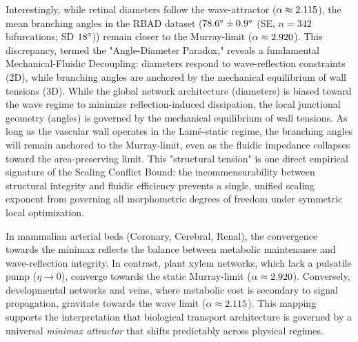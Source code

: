 Interestingly, while retinal diameters follow the wave-attractor ($\alpha
\approx 2.115$), the mean branching angles in the RBAD dataset
($78.6^\circ \pm 0.9^\circ$ (SE, $n{=}342$
bifurcations; SD $18^\circ$)) remain closer to the Murray-limit
($\alpha \approx 2.920$). This discrepancy, termed the "Angle-Diameter
Paradox," reveals a fundamental Mechanical-Fluidic Decoupling: diameters respond
to wave-reflection constraints (2D), while branching angles are anchored by the
mechanical equilibrium of wall tensions (3D). While the global network
architecture (diameters) is biased toward the wave regime to minimize
reflection-induced dissipation, the local junctional geometry (angles) is
governed by the mechanical equilibrium of wall tensions. As long as the vascular
wall operates in the Lam\'{e}-static regime, the branching angles will remain
anchored to the Murray-limit, even as the fluidic impedance collapses toward the
area-preserving limit. This "structural tension" is one direct empirical
signature of the Scaling Conflict Bound: the incommensurability between
structural integrity and fluidic efficiency prevents a single, unified scaling
exponent from governing all morphometric degrees of freedom under symmetric
local optimization.

In mammalian arterial beds (Coronary, Cerebral, Renal), the convergence towards
the minimax reflects the balance between metabolic maintenance and
wave-reflection integrity. In contrast, plant xylem networks, which lack a
pulsatile pump ($\eta \to 0$), converge towards the static Murray-limit ($\alpha
\approx 2.920$). Conversely, developmental networks and veins, where
metabolic cost is secondary to signal propagation, gravitate towards the wave
limit ($\alpha \approx 2.115$). This mapping supports the
interpretation that biological transport architecture is governed by a
universal \emph{minimax attractor} that shifts predictably across physical
regimes.
